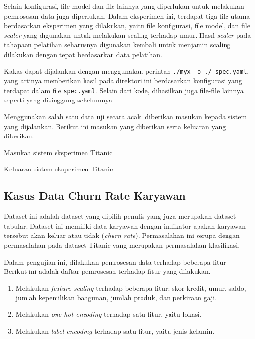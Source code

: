 Selain konfigurasi, file model dan file lainnya yang diperlukan untuk melakukan pemrosesan data juga diperlukan.
Dalam eksperimen ini, terdapat tiga file utama berdasarkan eksperimen yang dilakukan, yaitu file konfigurasi, file model, dan file \textit{scaler} yang digunakan untuk melakukan scaling terhadap umur.
Hasil \textit{scaler} pada tahapaan pelatihan seharusnya digunakan kembali untuk menjamin scaling dilakukan dengan tepat berdasarkan data pelatihan.

Kakas dapat dijalankan dengan menggunakan perintah \texttt{./myx -o ./ spec.yaml}, yang artinya memberikan hasil pada direktori ini berdasarkan konfigurasi yang terdapat dalam file \texttt{spec.yaml}.
Selain dari kode, dihasilkan juga file-file lainnya seperti yang disinggung sebelumnya.

Menggunakan salah satu data uji secara acak, diberikan masukan kepada sistem yang dijalankan.
Berikut ini masukan yang diberikan serta keluaran yang diberikan.

\begin{code}
	\caption{Masukan sistem eksperimen Titanic}
	\label{listing:20}
\end{code}

\begin{code}
	\caption{Keluaran sistem eksperimen Titanic}
	\label{listing:21}
\end{code}

\subsection{Kasus Data Churn Rate Karyawan}

Dataset ini adalah dataset yang dipilih penulis yang juga merupakan dataset tabular.
Dataset ini memiliki data karyawan dengan indikator apakah karyawan tersebut akan keluar atau tidak (\textit{churn rate}).
Permasalahan ini serupa dengan permasalahan pada dataset Titanic yang merupakan permasalahan klasifikasi.

Dalam pengujian ini, dilakukan pemrosesan data terhadap beberapa fitur.
Berikut ini adalah daftar pemrosesan terhadap fitur yang dilakukan.

\begin{enumerate}
	\item Melakukan \textit{feature scaling} terhadap beberapa fitur: skor kredit, umur, saldo, jumlah kepemilikan bangunan, jumlah produk, dan perkiraan gaji.
	\item Melakukan \textit{one-hot encoding} terhadap satu fitur, yaitu lokasi.
	\item Melakukan \textit{label encoding} terhadap satu fitur, yaitu jenis kelamin.
\end{enumerate}

